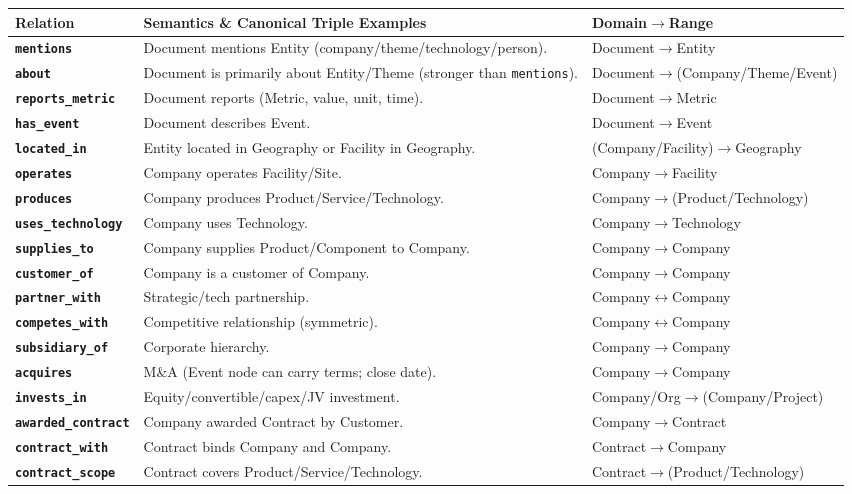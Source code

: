 \documentclass[11pt]{article}
\begin{document}
\begin{longtable}{>{\bfseries}p{3.8cm} p{9.6cm} p{2.1cm}}
\toprule
Relation & Semantics \& Canonical Triple Examples & Domain$\to$Range \\
\midrule
\texttt{mentions} & Document mentions Entity (company/theme/technology/person). & Document$\to$Entity \\
\texttt{about} & Document is primarily about Entity/Theme (stronger than \texttt{mentions}). & Document$\to$(Company/Theme/Event) \\
\texttt{reports\_metric} & Document reports (Metric, value, unit, time). & Document$\to$Metric \\
\texttt{has\_event} & Document describes Event. & Document$\to$Event \\
\texttt{located\_in} & Entity located in Geography or Facility in Geography. & (Company/Facility)$\to$Geography \\
\texttt{operates} & Company operates Facility/Site. & Company$\to$Facility \\
\texttt{produces} & Company produces Product/Service/Technology. & Company$\to$(Product/Technology) \\
\texttt{uses\_technology} & Company uses Technology. & Company$\to$Technology \\
\texttt{supplies\_to} & Company supplies Product/Component to Company. & Company$\to$Company \\
\texttt{customer\_of} & Company is a customer of Company. & Company$\to$Company \\
\texttt{partner\_with} & Strategic/tech partnership. & Company$\leftrightarrow$Company \\
\texttt{competes\_with} & Competitive relationship (symmetric). & Company$\leftrightarrow$Company \\
\texttt{subsidiary\_of} & Corporate hierarchy. & Company$\to$Company \\
\texttt{acquires} & M\&A (Event node can carry terms; close date). & Company$\to$Company \\
\texttt{invests\_in} & Equity/convertible/capex/JV investment. & Company/Org$\to$(Company/Project) \\
\texttt{awarded\_contract} & Company awarded Contract by Customer. & Company$\to$Contract \\
\texttt{contract\_with} & Contract binds Company and Company. & Contract$\to$Company \\
\texttt{contract\_scope} & Contract covers Product/Service/Technology. & Contract$\to$(Product/Technology) \\

\end{longtable}
\end{document}
